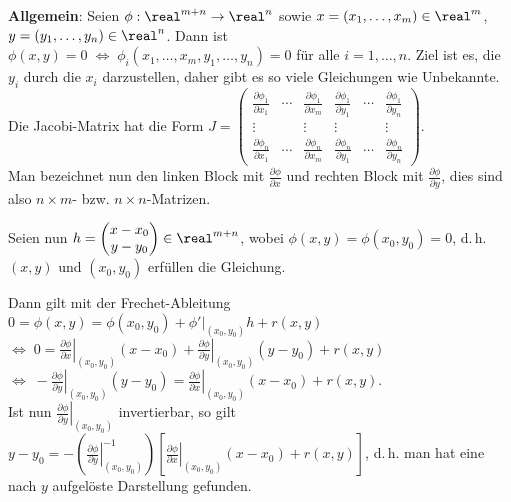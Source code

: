 \textbf{Allgemein}:
Seien $\phi: \real^{m+n} \rightarrow \real^n$
sowie $x = (x_1, \dotsc, x_m) \in \real^m$,
$y = (y_1, \dotsc, y_n) \in \real^n$.
Dann ist $\phi(x, y) = 0 \;\Leftrightarrow\;
\phi_i(x_1, \dotsc, x_m, y_1, \dotsc, y_n) = 0$ für alle $i = 1, \dotsc, n$.
Ziel ist es, die $y_i$ durch die $x_i$ darzustellen, daher gibt es
so viele Gleichungen wie Unbekannte. \\
Die Jacobi-Matrix hat die Form
$J = \left(\begin{array}{ccc|ccc}
\frac{\partial \phi_1}{\partial x_1} & \cdots &
\frac{\partial \phi_1}{\partial x_m} &
\frac{\partial \phi_1}{\partial y_1} & \cdots &
\frac{\partial \phi_1}{\partial y_n} \\
\vdots & & \vdots & \vdots & & \vdots \\
\frac{\partial \phi_n}{\partial x_1} & \cdots &
\frac{\partial \phi_n}{\partial x_m} &
\frac{\partial \phi_n}{\partial y_1} & \cdots &
\frac{\partial \phi_n}{\partial y_n}
\end{array}\right)$. \\
Man bezeichnet nun den linken Block mit $\frac{\partial \phi}{\partial x}$
und rechten Block mit $\frac{\partial \phi}{\partial y}$, dies sind also
$n \times m$- bzw. $n \times n$-Matrizen.

Seien nun $h = \begin{pmatrix}x - x_0\\y - y_0\end{pmatrix} \in \real^{m+n}$,
wobei $\phi(x, y) = \phi(x_0, y_0) = 0$, d.\,h. $(x, y)$ und $(x_0, y_0)$
erfüllen die Gleichung.

Dann gilt mit der Frechet-Ableitung
$0 = \phi(x, y) = \phi(x_0, y_0) + \phi'|_{(x_0,y_0)}h + r(x, y)$ \\
$\Leftrightarrow\; 0 = \left.\frac{\partial \phi}{\partial
x}\right|_{(x_0,y_0)}(x - x_0) + \left.\frac{\partial \phi}{\partial
y}\right|_{(x_0,y_0)}(y - y_0) + r(x, y)$ \\
$\Leftrightarrow\;
-\left.\frac{\partial \phi}{\partial y}\right|_{(x_0,y_0)}(y - y_0) =
\left.\frac{\partial \phi}{\partial x}\right|_{(x_0,y_0)} (x - x_0) +
r(x, y)$. \\
Ist nun $\left.\frac{\partial \phi}{\partial y}\right|_{(x_0,y_0)}$
invertierbar, so gilt
$y - y_0 = - \left(\left.\frac{\partial \phi}{\partial
y}\right|_{(x_0,y_0)}^{-1}\right) \left[\left.\frac{\partial \phi}{\partial
x}\right|_{(x_0,y_0)} (x - x_0) +  r(x, y)\right]$, d.\,h. man hat eine
nach $y$ aufgelöste Darstellung gefunden.

